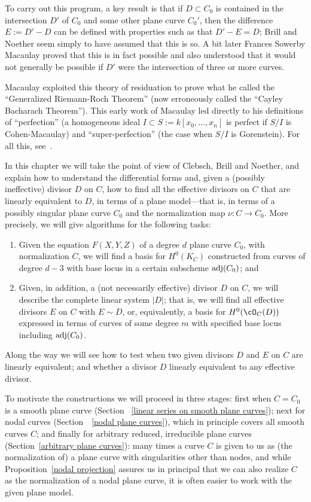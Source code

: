 To carry out this program, a key result is that if $D\subset C_0$ is contained in the intersection
$D'$ of $C_0$ and some other plane curve $C_0'$, then the difference 
$E := D'-D$ can be defined with properties such as that $D'-E = D$; Brill and Noether seem simply to have assumed that this is so. A bit later Frances Sowerby Macaulay proved that this is in fact possible  and also understood that it would not generally be possible if $D'$ were the intersection of three or more curves. 

Macaulay exploited this theory of residuation  to prove what he called the ``Generalized Riemann-Roch Theorem'' (now erroneously called the ``Cayley Bacharach Theorem''). This early work of Macaulay led directly to his definitions of  ``perfection'' (a homogeneous ideal
$I  \subset S:= k[x_0, \dots, x_n]$ is perfect if $S/I$ is Cohen-Macaulay) and ``super-perfection'' (the case when $S/I$ is
Gorenstein). For all this, see~\cite{Eisenbud-Gray}.

In this chapter we will take the point of view of Clebsch, Brill and Noether, and explain how to understand 
the differential forms and, given a (possibly ineffective) divisor $D$ on $C$, how to find all the 
effective divisors on $C$ that are linearly equivalent to $D$, in terms of a plane model---that is, 
in terms of a possibly singular plane curve $C_{0}$ and the normalization map $\nu: C\to C_{0}$.
More precisely, we will give algorithms for the following tasks:
 
\begin{enumerate}
\item Given the equation $F(X,Y,Z)$ of a degree $d$ plane curve $C_0$, with normalization $C$, we will find a basis for $H^0(K_C)$ constructed from curves of degree $d-3$ with base locus in a certain subscheme $\adj(C_{0})$; and
\item  Given, in addition, a (not necessarily effective) divisor $D$ on $C$, we will describe the complete linear system $|D|$; that is, we will find all effective divisors $E$ on $C$ with $E \sim D$, or, equivalently, a basis for $H^0(\cO_C(D))$ expressed in terms of curves of some degree $m$ with specified base locus including $\adj(C_{0})$.
\end{enumerate}

Along the way we will see how to test when two given divisors $D$ and $E$ on $C$ are linearly equivalent; and whether a divisor $D$ linearly equivalent to any effective divisor.

To motivate the constructions we will proceed in three stages: first when $C = C_0$ is a smooth plane curve (Section~ \ref{linear series on smooth plane curves}); next for nodal curves (Section~~\ref{nodal plane curves}), which in principle  covers all smooth curves $C$; and finally for arbitrary reduced, irreducible plane curves (Section~\ref{arbitrary plane curves}): many times a curve $C$ is given to us as (the normalization of) a plane curve with singularities other than nodes, and while Proposition~\ref{nodal projection} assures us in principal that we can also realize $C$ as the normalization of a nodal plane curve, it is often easier to work with the given plane model. 

